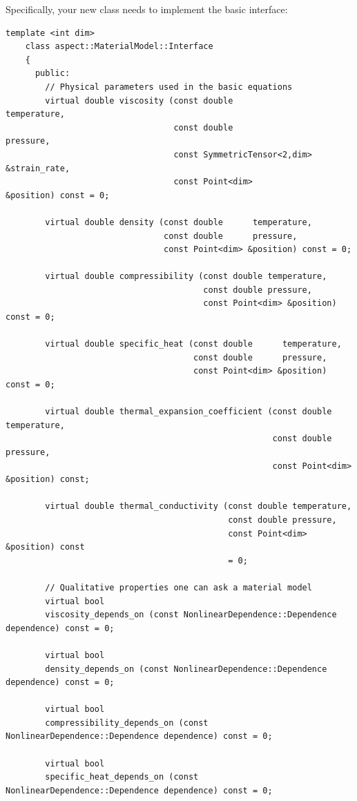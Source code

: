 \documentclass{article}
\begin{document}
Specifically, your new class needs to implement the basic interface:
\begin{lstlisting}[frame=single]
    template <int dim>
    class aspect::MaterialModel::Interface
    {
      public:
        // Physical parameters used in the basic equations
        virtual double viscosity (const double                  temperature,
                                  const double                  pressure,
                                  const SymmetricTensor<2,dim> &strain_rate,
                                  const Point<dim>             &position) const = 0;

        virtual double density (const double      temperature,
                                const double      pressure,
                                const Point<dim> &position) const = 0;

        virtual double compressibility (const double temperature,
                                        const double pressure,
                                        const Point<dim> &position) const = 0;

        virtual double specific_heat (const double      temperature,
                                      const double      pressure,
                                      const Point<dim> &position) const = 0;

        virtual double thermal_expansion_coefficient (const double      temperature,
                                                      const double      pressure,
                                                      const Point<dim> &position) const;

        virtual double thermal_conductivity (const double temperature,
                                             const double pressure,
                                             const Point<dim> &position) const
                                             = 0;

        // Qualitative properties one can ask a material model
        virtual bool
        viscosity_depends_on (const NonlinearDependence::Dependence dependence) const = 0;

        virtual bool
        density_depends_on (const NonlinearDependence::Dependence dependence) const = 0;

        virtual bool
        compressibility_depends_on (const NonlinearDependence::Dependence dependence) const = 0;

        virtual bool
        specific_heat_depends_on (const NonlinearDependence::Dependence dependence) const = 0;


\end{lstlisting}
\end{document}
